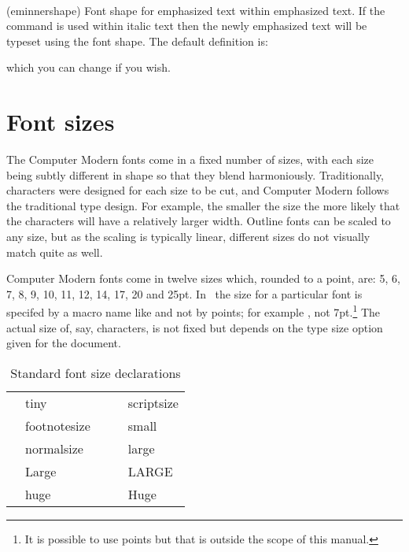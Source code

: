 \begin{syntax}
\cmd{\eminnershape} \\
\end{syntax}
\glossary(eminnershape)%
  {}%
  {Font shape for emphasized text within emphasized text.}%
If the \cmd{\emph} command is used within italic text then the
newly emphasized text will be typeset using the 
\cmd{\eminnershape} font shape. The default definition is:
\begin{lcode}
\newcommand*{\eminnershape}{\upshape}
\end{lcode}
which you can change if you wish.



\section{Font sizes}

    The Computer Modern \metafont{} fonts come in a fixed number of 
sizes, with
each size being subtly different in shape so that they blend harmoniously.
Traditionally, characters were designed for each size to be cut, and
Computer Modern follows the traditional type design. For example, the smaller
the size the more likely that the characters will have a relatively larger
width.
Outline fonts can be scaled to any size, 
but as the scaling is typically 
linear, different sizes do not visually match quite as well.

    Computer Modern fonts come in twelve sizes which, rounded to a point,
are: 5, 6, 7, 8, 9, 10, 11, 12, 14, 17, 20 and 25pt.
   In \ltx\ the size for a particular font is specifed by a macro name like
 and not by points; for example , not 
7pt.\footnote{It is possible to use points but that is outside the scope
of this manual.} 
The actual size of, say,  characters, is not fixed but depends
on the type size option given for the document. 

\begin{table}
\centering
\caption{Standard font size declarations} \label{tab:fontsize}
\begin{tabular}{llcll} \toprule
\cmd{\tiny} & {\tiny tiny} & & \cmd{\scriptsize} & {\scriptsize scriptsize} \\[5pt]
\cmd{\footnotesize} & {\footnotesize footnotesize} & & \cmd{\small} & {\small small} \\[5pt]
\cmd{\normalsize} & {\normalsize normalsize} & & \cmd{\large} & {\large large} \\[5pt]
\cmd{\Large} & {\Large Large} & & \cmd{\LARGE} & {\LARGE LARGE} \\[5pt]
\cmd{\huge} & {\huge huge} & & \cmd{\Huge} & {\Huge Huge} \\[5pt]
\bottomrule
\end{tabular}
\end{table}


